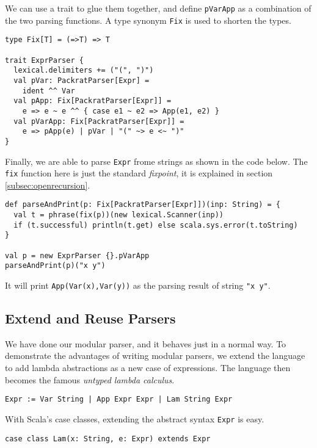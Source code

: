 We can use a trait to glue them together, and define \lstinline{pVarApp} as a combination of the two parsing functions. A type synonym \lstinline{Fix} is used to shorten the types.

\begin{lstlisting}
type Fix[T] = (=>T) => T

trait ExprParser {
  lexical.delimiters += ("(", ")")
  val pVar: PackratParser[Expr] =
    ident ^^ Var
  val pApp: Fix[PackratParser[Expr]] =
    e => e ~ e ^^ { case e1 ~ e2 => App(e1, e2) }
  val pVarApp: Fix[PackratParser[Expr]] =
    e => pApp(e) | pVar | "(" ~> e <~ ")"
}
\end{lstlisting}

Finally, we are able to parse \lstinline{Expr} frome strings as shown in the code below. The \lstinline{fix} function here is just the standard \textit{fixpoint}, it is explained in section \ref{subsec:openrecursion}.

\begin{lstlisting}
def parseAndPrint(p: Fix[PackratParser[Expr]])(inp: String) = {
  val t = phrase(fix(p))(new lexical.Scanner(inp))
  if (t.successful) println(t.get) else scala.sys.error(t.toString)
}

val p = new ExprParser {}.pVarApp
parseAndPrint(p)("x y")
\end{lstlisting}

It will print \lstinline{App(Var(x),Var(y))} as the parsing result of string \lstinline{"x y"}.

\subsection{Extend and Reuse Parsers}\label{subsec:overview-extend}

We have done our modular parser, and it behaves just in a normal way. To demonstrate the advantages of writing modular parsers, we extend the language to add lambda abstractions as a new case of expressions. The language then becomes the famous \textit{untyped lambda calculus}.

\begin{lstlisting}[language=PlainCode]
Expr := Var String | App Expr Expr | Lam String Expr
\end{lstlisting}

With Scala's case classes, extending the abstract syntax \lstinline{Expr} is easy.

\begin{lstlisting}
case class Lam(x: String, e: Expr) extends Expr
\end{lstlisting}

